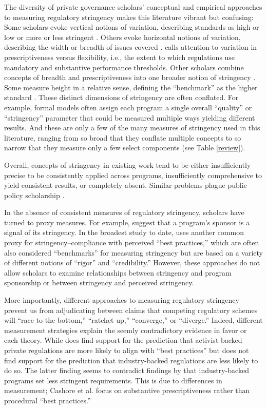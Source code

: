 \documentclass[
      12pt,
            Review ]{article}
\begin{document}
The diversity of private governance scholars' conceptual and empirical
approaches to measuring regulatory stringency makes this literature
vibrant but confusing: Some scholars evoke vertical notions of
variation, describing standards as high or low or more or less stringent
\citep{Fischer2014, Li2015}. Others evoke horizontal notions of
variation, describing the width or breadth of issues covered
\citep{Auld2014, Heyes2017}. \citet{Cashore2007} calls attention to
variation in prescriptiveness versus flexibility, i.e., the extent to
which regulations use mandatory and substantive performance thresholds.
Other scholars combine concepts of breadth and prescriptiveness into one
broader notion of stringency \citep{Fransen2011}. Some measure height in
a relative sense, defining the ``benchmark'' as the higher standard
\citep{Overdevest2005, Overdevest2010}. These distinct dimensions of
stringency are often conflated. For example, formal models often assign
each program a single overall ``quality'' or ``stringency'' parameter
that could be measured multiple ways yielding different results. And
these are only a few of the many measures of stringency used in this
literature, ranging from so broad that they conflate multiple concepts
to so narrow that they measure only a few select components (see Table
\ref{review}).

Overall, concepts of stringency in existing work tend to be either
insufficiently precise to be consistently applied across programs,
insufficiently comprehensive to yield consistent results, or completely
absent. Similar problems plague public policy scholarship
\citep{Brunel2016}.



In the absence of consistent measures of regulatory stringency, scholars
have turned to proxy measures. For example, \citet{Darnall2010} suggest
that a program's sponsor is a signal of its stringency. In the broadest
study to date, \citet{VanderVen2015} uses another common proxy for
stringency--compliance with perceived ``best practices,'' which are
often also considered ``benchmarks'' for measuring stringency but are
based on a variety of different notions of ``rigor'' and
``credibility.'' However, these approaches do not allow scholars to
examine relationships between stringency and program sponsorship or
between stringency and perceived stringency.

More importantly, different approaches to measuring regulatory
stringency prevent us from adjudicating between claims that competing
regulatory schemes will ``race to the bottom,'' ``ratchet up,''
``converge,'' or ``diverge.'' Indeed, different measurement strategies
explain the seemly contradictory evidence in favor or each theory. While
\citet{VanderVen2015} does find support for the prediction that
activist-backed private regulations are more likely to align with ``best
practices'' but does not find support for the prediction that
industry-backed regulations are less likely to do so. The latter finding
seems to contradict findings by \citet{Cashore2004} that industry-backed
programs set less stringent requirements. This is due to differences in
measurement; Cashore et al. focus on substantive prescriptiveness rather
than procedural ``best practices.''
\end{document}
